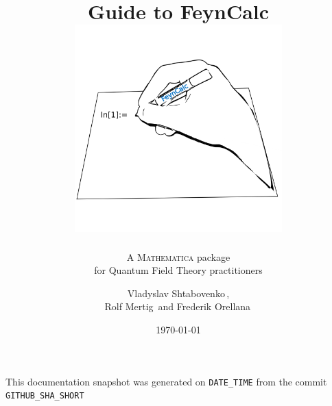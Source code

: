 \documentclass[11pt,a4paper,
parskip=half, %
]{scrreprt}
\author{}
\date{}
\begin{document}
\title{\Huge Guide to FeynCalc \\
\centering\includegraphics[width=8cm]{figures/logo.png}}
\subtitle{\LARGE A \textsc{Mathematica} package \\ for Quantum Field Theory practitioners}


\author{Vladyslav Shtabovenko\,, \\Rolf Mertig\, and  Frederik Orellana\,}
\date{\today}
\maketitle

This documentation snapshot was generated on \texttt{DATE_TIME} from the commit \texttt{GITHUB_SHA_SHORT}

{\hypersetup{hidelinks}
\tableofcontents
}	

%
%
%

\printindex
\end{document}
